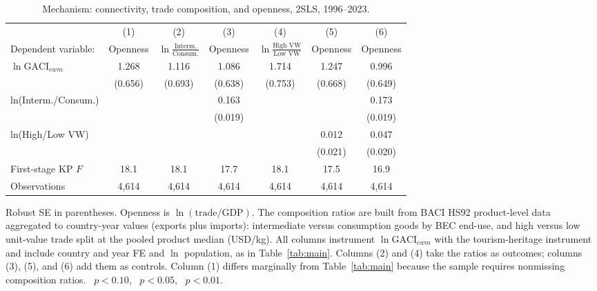 \begin{table}[H]
\centering
\caption{Mechanism: connectivity, trade composition, and openness, 2SLS,
1996--2023.}
\label{tab:mechanism}
\begin{threeparttable}
\small
\begin{tabular}{lcccccc}
\toprule
 & (1) & (2) & (3) & (4) & (5) & (6) \\
Dependent variable: & Openness & $\ln\frac{\text{Interm.}}{\text{Consum.}}$ & Openness & $\ln\frac{\text{High VW}}{\text{Low VW}}$ & Openness & Openness \\
\midrule
$\ln\mathrm{GACI}_{cwm}$ & 1.268\sym{*} & 1.116 & 1.086\sym{*} & 1.714\sym{**} & 1.247\sym{*} & 0.996 \\
 & (0.656) & (0.693) & (0.638) & (0.753) & (0.668) & (0.649) \\
ln(Interm./Consum.) &  &  & 0.163\sym{***} &  &  & 0.173\sym{***} \\
 &  &  & (0.019) &  &  & (0.019) \\
ln(High/Low VW) &  &  &  &  & 0.012 & 0.047\sym{**} \\
 &  &  &  &  & (0.021) & (0.020) \\
\midrule
First-stage KP $F$ & 18.1 & 18.1 & 17.7 & 18.1 & 17.5 & 16.9 \\
Observations & 4{,}614 & 4{,}614 & 4{,}614 & 4{,}614 & 4{,}614 & 4{,}614 \\
\bottomrule
\end{tabular}
\begin{tablenotes}\footnotesize
\item Robust SE in parentheses. Openness is $\ln(\text{trade}/\text{GDP})$.
The composition ratios are built from BACI HS92 product-level data aggregated
to country-year values (exports plus imports): intermediate versus consumption
goods by BEC end-use, and high versus low unit-value trade split at the pooled
product median (USD/kg). All columns instrument $\ln\mathrm{GACI}_{cwm}$ with
the tourism-heritage instrument and include country and year FE and $\ln$
population, as in Table~\ref{tab:main}. Columns (2) and (4) take the ratios as
outcomes; columns (3), (5), and (6) add them as controls. Column (1) differs
marginally from Table~\ref{tab:main} because the sample requires nonmissing
composition ratios.
\sym{*}~$p<0.10$, \sym{**}~$p<0.05$, \sym{***}~$p<0.01$.
\end{tablenotes}
\end{threeparttable}
\end{table}

